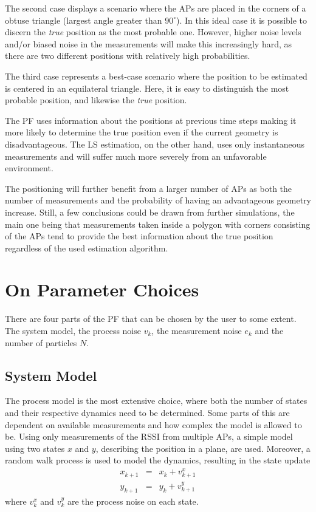 \documentclass{LTHthesis}
\begin{document}
The second case displays a scenario where the APs are placed in the corners of a obtuse triangle (largest angle greater than $90^\circ$). In this ideal case it is possible to discern the \emph{true} position as the most probable one. However, higher noise levels and/or biased noise in the measurements will make this increasingly hard, as there are two different positions with relatively high probabilities.

The third case represents a best-case scenario where the position to be estimated is centered in an equilateral triangle. Here, it is easy to distinguish the most probable position, and likewise the \emph{true} position.

The PF uses information about the positions at previous time steps making it more likely to determine the true position even if the current geometry is disadvantageous. The LS estimation, on the other hand, uses only instantaneous measurements and will suffer much more severely from an unfavorable environment. 
 
The positioning will further benefit from a larger number of APs as both the number of measurements and the probability of having an advantageous geometry increase. Still, a few conclusions could be drawn from further simulations, the main one being that measurements taken inside a polygon with corners consisting of the APs tend to provide the best information about the true position regardless of the used estimation algorithm. 
%
\section{On Parameter Choices}
%
There are four parts of the PF that can be chosen by the user to some extent. The system model, the process noise $v_k$,  the measurement noise $e_k$  and the number of particles $N$.
%
\subsection{System Model}
%
The process model is the most extensive choice, where both the number of states and their respective dynamics need to be determined. Some parts of this are dependent on available measurements and how complex the model is allowed to be. Using only measurements of the RSSI from multiple APs, a simple model using two states $x$ and $y$, describing the position in a plane, are used. Moreover, a random walk process is used to model the dynamics, resulting in the state update
%
\begin{eqnarray}
x_{k+1}&=&x_k + v^x_{k+1} \\
y_{k+1}&=&y_k + v^y_{k+1} 
\end{eqnarray}
%
where $v^x_k$ and $v^y_k$ are the process noise on each state. 
%
\end{document}
